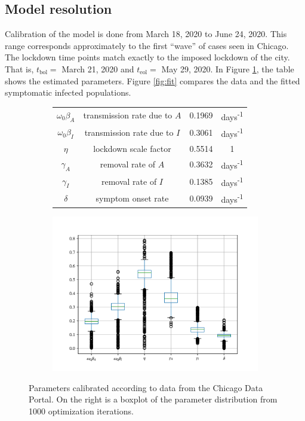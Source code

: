 \documentclass[11pt]{article}
\begin{document}
	\subsection{Model resolution}
		Calibration of the model is done from March 18, 2020 to June 24, 2020.
		This range corresponds approximately to the first ``wave'' of cases seen in Chicago.
		The lockdown time points match exactly to the imposed lockdown of the city.
		That is, $t_\mathrm{bol} =$ March 21, 2020 and $t_\mathrm{eol} =$ May 29, 2020.
		In Figure \ref{fig:params}, the table shows the estimated parameters.
		Figure \ref{fig:fit} compares the data and the fitted symptomatic infected populations.
		\begin{figure}[h!]
			\centering
			\begin{subfigure}{0.55\textwidth}
				\begin{tabular}{c c c c}
					\hline
					$\omega_0 \beta_A$ & transmission rate due to $A$ & 0.1969 & days\textsuperscript{-1} \\
					$\omega_0 \beta_I$ & transmission rate due to $I$ & 0.3061 & days\textsuperscript{-1} \\
					$\eta$ & lockdown scale factor & 0.5514 & 1 \\
					$\gamma_A$ & removal rate of $A$ & 0.3632 & days\textsuperscript{-1} \\
					$\gamma_I$ & removal rate of $I$ & 0.1385 & days\textsuperscript{-1} \\
					$\delta$ & symptom onset rate & 0.0939 & days\textsuperscript{-1} \\
					\hline
				\end{tabular}
			\end{subfigure}%
			\begin{subfigure}{0.45\textwidth}
				\includegraphics[width=\textwidth]{box-plot.pdf}
			\end{subfigure}
			\caption{Parameters calibrated according to data from the Chicago Data Portal.
				On the right is a boxplot of the parameter distribution from 1000 optimization iterations.}
			\label{fig:params}
		\end{figure}
	
\end{document}
